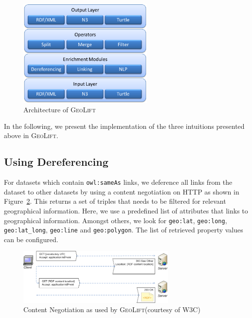 \documentclass[a4paper,twoside,bibtotoc,abstracton,12pt,BCOR=15mm]{article}
\newcommand{\geolift}{\textsc{GeoLift}\xspace}
\begin{document}
\begin{figure}[ht!]
			\centering
			\includegraphics[width = 0.6\textwidth]{images/geolift_architecture.png}
			\caption{Architecture of \geolift}
			\label{fig:architecture}
		\end{figure}

In the following, we present the implementation of the three intuitions presented above in \geolift.
\subsection{Using Dereferencing}
For datasets which contain \texttt{owl:sameAs} links, we deference all links from the dataset to other datasets by using a content negotiation on HTTP as shown in Figure~\ref{fig:contentNegotiation}.
This returns a set of triples that needs to be filtered for relevant geographical information.
Here, we use a predefined list of attributes that links to geographical information.
Amongst others, we look for \texttt{geo:lat}, \texttt{geo:long}, \texttt{geo:lat\_long}, \texttt{geo:line} and \texttt{geo:polygon}.
The list of retrieved property values can be configured.

\begin{figure}[htb]
\centering
\includegraphics[width=0.7\textwidth]{images/contentnegotiation}
\caption{Content Negotiation as used by \geolift (courtesy of W3C)}
\label{fig:contentNegotiation}
\end{figure}
\end{document}
